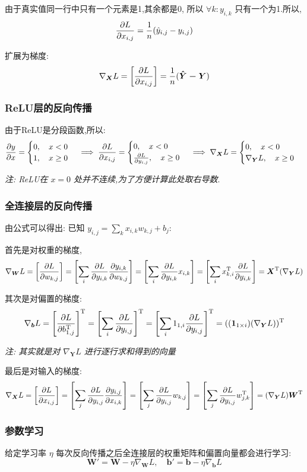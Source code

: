 由于真实值同一行中只有一个元素是1,其余都是0, 所以 $\forall k: y_{i,k}$ 只有一个为1.所以,
$$
\frac{\partial L}{\partial x_{i,j}} = \frac{1}{n}(\hat{y}_{i,j} - y_{i,j})
$$

扩展为梯度:
$$
\nabla_{\boldsymbol{X}} L = \left[\frac{\partial L}{\partial x_{i,j}}\right] = \frac{1}{n}(\boldsymbol{\hat{Y}-Y})
$$

\subsubsection{ReLU层的反向传播}

由于ReLU是分段函数,所以:
\begin{align*}
    \frac{\partial y}{\partial x} = \begin{cases}
    0 ,\quad x<0 \\
    1 ,\quad x \ge 0
    \end{cases} \implies
    \frac{\partial L}{\partial x_{i,j}} = \begin{cases}
    0 ,\quad x<0 \\
    \frac{\partial L}{\partial y_{i,j}} ,\quad x \ge 0
    \end{cases} \implies
    \nabla_{\boldsymbol{X}} L = \begin{cases}
    0 ,\quad x<0 \\
    \nabla_{\boldsymbol{Y}} L ,\quad x \ge 0
    \end{cases}
\end{align*}


\textit{注: ReLU在 $x=0$ 处并不连续,为了方便计算此处取右导数}.

\subsubsection{全连接层的反向传播}
由公式可以得出: 已知 $y_{i,j} = \sum_k x_{i,k}w_{k,j} + b_{j}$:

首先是对权重的梯度,
$$
\nabla_{\boldsymbol{W}} L = \left[\frac{\partial L}{\partial w_{k,j}}\right] = \left[\sum_i \frac{\partial L}{\partial y_{i,k}} \frac{\partial y_{i,k}}{\partial w_{k,j}}\right] = \left[\sum_i \frac{\partial L}{\partial y_{i,k}} x_{i,k}\right] = \left[\sum_i x^{\mathrm{T}}_{k,i}\frac{\partial L}{\partial y_{i,k}}\right] = \boldsymbol{X}^{\mathrm{T}} (\nabla_{\boldsymbol{Y}} L)
$$

其次是对偏置的梯度:
$$
\nabla_{\boldsymbol{b}} L = \left[\frac{\partial L}{\partial b^{\mathrm{T}}_{1,j}}\right]^{\mathrm{T}} = \left[\sum_i \frac{\partial L}{\partial y_{i,j}}\right]^{\mathrm{T}} = \left[\sum_i 1_{1,i} \frac{\partial L}{\partial y_{i,j}}\right]^{\mathrm{T}} = ((\boldsymbol{1}_{1 \times i}) (\nabla_{\boldsymbol{Y}} L))^{\mathrm{T}}
$$

\textit{注: 其实就是对 $\nabla_{\boldsymbol{Y}} L$ 进行逐行求和得到的向量}

最后是对输入的梯度:
$$
\nabla_{\boldsymbol{X}} L = \left[\frac{\partial L}{\partial x_{i,j}}\right] = \left[\sum_j \frac{\partial L}{\partial y_{i,j}} \frac{\partial y_{i,j}}{\partial x_{i,k}}\right] = \left[\sum_j \frac{\partial L}{\partial y_{i,j}} w_{k,j}\right] = \left[\sum_j  \frac{\partial L}{\partial y_{i,j}} w^{\mathrm{T}}_{j,k}\right] = (\nabla_{\boldsymbol{Y}} L) \boldsymbol{W}^{\mathrm{T}} 
$$

\subsubsection{参数学习}
给定学习率 $\eta$ 每次反向传播之后全连接层的权重矩阵和偏置向量都会进行学习:
$$
\boldsymbol{W}' = \boldsymbol{W} - \eta \nabla_{\boldsymbol{W}} L, \quad \boldsymbol{b}' = \boldsymbol{b} - \eta \nabla_{\boldsymbol{b}} L
$$


